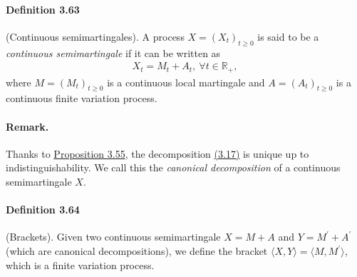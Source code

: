 \documentclass{article}
\numberwithin{equation}{section}
\theoremstyle{plain}
\theoremstyle{definition}
\begin{document}
\paragraph{Definition 3.63\label{def:3.63}} (Continuous semimartingales). A process $X=(X_t)_{t\geq 0}$ is said to be a \textit{continuous semimartingale} if it can be written as
\begin{align*}
	X_t = M_t + A_t,\ \forall t\in\mathbb{R}_+, \tag{3.17}\label{eq:3.17}
\end{align*}
where $M=(M_t)_{t\geq 0}$ is a continuous local martingale and $A=(A_t)_{t\geq 0}$ is a continuous finite variation process.
\paragraph{Remark.} Thanks to \hyperref[prop:3.55]{Proposition 3.55}, the decomposition \hyperref[eq:3.17]{(3.17)} is unique up to indistinguishability. We call this the \textit{canonical decomposition} of a continuous semimartingale $X$.

\paragraph{Definition 3.64\label{def:3.64}} (Brackets). Given two continuous semimartingale $X=M+A$ and $Y=M^\prime+A^\prime$ (which are canonical decompositions), we define the bracket $\langle X,Y\rangle=\langle M,M^\prime\rangle$, which is a finite variation process.
\end{document}
